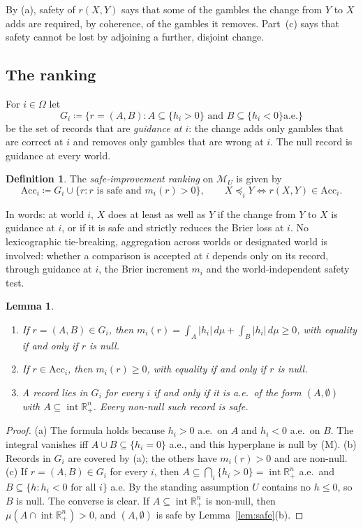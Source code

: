 \documentclass[11pt]{article}
\newcommand{\R}{\mathbb{R}}
\newcommand{\M}{\mathcal{M}}
\newcommand{\Acc}{\mathrm{Acc}}
\newcommand{\Rpp}{\inter\R^n_{+}}
\DeclareMathOperator{\inter}{int}
\theoremstyle{plain}
\newtheorem{lemma}[theorem]{Lemma}
\theoremstyle{definition}
\newtheorem{definition}[theorem]{Definition}
\theoremstyle{remark}
\begin{document}
By (a), safety of $r(X,Y)$ says that some of the gambles the change from $Y$ to $X$ adds
are required, by coherence, of the gambles it removes. Part~(c) says that safety cannot be
lost by adjoining a further, disjoint change.

\subsection{The ranking}

For $i\in\Omega$ let
\[
  G_i\coloneqq\{r=(A,B): A\subseteq\{h_i>0\}\text{ and }B\subseteq\{h_i<0\}\text{
  a.e.}\}
\]
be the set of records that are \emph{guidance at $i$}: the change adds only gambles that
are correct at $i$ and removes only gambles that are wrong at $i$. The null record is
guidance at every world.

\begin{definition}\label{def:SI}
The \emph{safe-improvement ranking} on $\M_U$ is given by
\[
  \Acc_i\coloneqq G_i\cup\{r: r\text{ is safe and }m_i(r)>0\},\qquad
  X\preceq_iY\iff r(X,Y)\in\Acc_i .
\]
\end{definition}

In words: at world $i$, $X$ does at least as well as $Y$ if the change from $Y$ to $X$ is
guidance at $i$, or if it is safe and strictly reduces the Brier loss at $i$. No
lexicographic tie-breaking, aggregation across worlds or designated world is involved:
whether a comparison is accepted at $i$ depends only on its record, through guidance at
$i$, the Brier increment $m_i$ and the world-independent safety test.

\begin{lemma}\label{lem:increment}
\begin{enumerate}[label=(\alph*)]
  \item If $r=(A,B)\in G_i$, then $m_i(r)=\int_A|h_i|\,d\mu+\int_B|h_i|\,d\mu\ge0$, with
  equality if and only if $r$ is null.
  \item If $r\in\Acc_i$, then $m_i(r)\ge0$, with equality if and only if $r$ is null.
  \item A record lies in $G_i$ for every $i$ if and only if it is a.e.\ of the form
  $(A,\emptyset)$ with $A\subseteq\Rpp$. Every non-null such record is safe.
\end{enumerate}
\end{lemma}

\begin{proof}
(a) The formula holds because $h_i>0$ a.e.\ on $A$ and $h_i<0$ a.e.\ on $B$. The integral
vanishes iff $A\cup B\subseteq\{h_i=0\}$ a.e., and this hyperplane is null by (M).
(b) Records in $G_i$ are covered by (a); the others have $m_i(r)>0$ and are non-null.
(c) If $r=(A,B)\in G_i$ for every $i$, then $A\subseteq\bigcap_i\{h_i>0\}=\Rpp$ a.e.\
and $B\subseteq\{h:h_i<0\text{ for all }i\}$ a.e. By the standing assumption $U$
contains no $h\le0$, so $B$ is null. The converse is clear. If $A\subseteq\Rpp$ is
non-null, then $\mu(A\cap\Rpp)>0$, and $(A,\emptyset)$ is safe by
Lemma~\ref{lem:safe}(b).
\end{proof}
\end{document}
